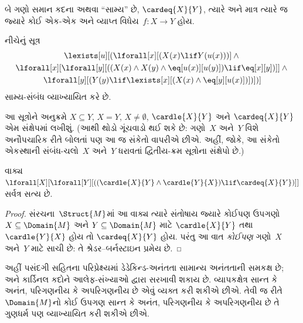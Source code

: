 બે ગણો સમાન કદના અથવા ``સામ્ય'' છે, $\cardeq{X}{Y}$, ત્યારે અને
માત્ર ત્યારે જ જ્યારે કોઈ એક-એક અને વ્યાપ્ત વિધેય~$f\colon X \to Y$
હોય.

\begin{prop}
નીચેનું સૂત્ર
\begin{multline*}
  \lexists[u][(\lforall[x][(X(x) \lif Y(u(x)))] \land {}\\
    \lforall[x][\lforall[y][((X(x) \land X(y) \land \eq[u(x)][u(y)]) \lif \eq[x][y])]]
  \land {} \\\lforall[y][(Y(y) \lif \lexists[x][(X(x)
      \land \eq[y][u(x)])])])]
\end{multline*}
સામ્ય-સંબંધ વ્યાખ્યાયિત કરે છે.
\end{prop}


આ સૂત્રોને અનુક્રમે $X \subseteq Y$, $X = Y$, $X \neq
\emptyset$, $\cardle{X}{Y}$ અને $\cardeq{X}{Y}$ એમ સંક્ષેપમાં
લખીશું. (આથી થોડો ગૂંચવાડો થઈ શકે છે: ગણો~$X$ અને~$Y$ વિશે
અનૌપચારિક રીતે બોલતાં પણ આ જ સંકેતો વાપરીએ છીએ. અહીં, જોકે, આ
સંકેતો એકસ્થાની સંબંધ-ચલો~$X$ અને~$Y$ ધરાવતાં દ્વિતીય-ક્રમ
સૂત્રોના સંક્ષેપો છે.)

\begin{prop}
વાક્ય~$\lforall[X][\lforall[Y][((\cardle{X}{Y} \land
    \cardle{Y}{X}) \lif \cardeq{X}{Y})]]$ સર્વત્ર સત્ય છે.
\end{prop}

\begin{proof}
સંરચના~$\Struct{M}$માં આ વાક્ય ત્યારે સંતોષાય જ્યારે
કોઈપણ ઉપગણો $X \subseteq \Domain{M}$ અને $Y \subseteq
\Domain{M}$ માટે $\cardle{X}{Y}$ તથા $\cardle{Y}{X}$ હોય તો
$\cardeq{X}{Y}$ હોય. પરંતુ આ વાત \emph{કોઈપણ} ગણો~$X$ અને~$Y$
માટે સાચી છે: તે શ્રેડર--બર્નસ્ટાઇન પ્રમેય છે.
\end{proof}
\endgroup


\begingroup
\makeatletter{}\makeatother


\label{guunit:OLP-0339}


\begin{explain}
અહીં પસંદગી સહિતના પરિપ્રેક્ષ્યમાં ડેડેકિન્ડ-અનંતતા સામાન્ય
અનંતતાની સમકક્ષ છે; અને કાર્ડિનલ કદોને આલેફ-સંખ્યાઓ દ્વારા
સરખાવી શકાય છે.
વ્યાપકક્ષેત્ર સાન્ત કે અનંત, પરિગણનીય કે અપરિગણનીય
છે એવું વ્યક્ત કરી શકીએ છીએ. તેવી જ રીતે~$\Domain{M}$નો કોઈ ઉપગણ
સાન્ત કે અનંત, પરિગણનીય કે અપરિગણનીય છે તે ગુણધર્મ
પણ વ્યાખ્યાયિત કરી શકીએ છીએ.
\end{explain}

